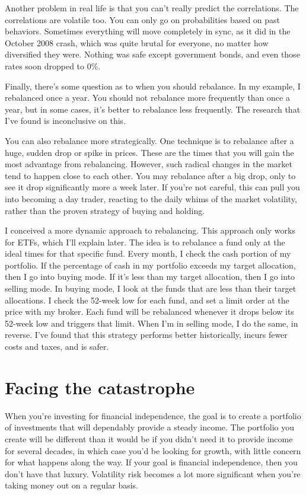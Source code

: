Another problem in real life is that you can't really predict the correlations. The correlations are volatile too. You can only go on probabilities based on past behaviors. Sometimes everything will move completely in sync, as it did in the October 2008 crash, which was quite brutal for everyone, no matter how diversified they were. Nothing was safe except government bonds, and even those rates soon dropped to 0\%.

Finally, there's some question as to when you should rebalance. In my example, I rebalanced once a year. You should not rebalance more frequently than once a year, but in some cases, it's better to rebalance less frequently. The research that I've found is inconclusive on this.

You can also rebalance more strategically. One technique is to rebalance after a huge, sudden drop or spike in prices. These are the times that you will gain the most advantage from rebalancing. However, such radical changes in the market tend to happen close to each other. You may rebalance after a big drop, only to see it drop significantly more a week later. If you're not careful, this can pull you into becoming a day trader, reacting to the daily whims of the market volatility, rather than the proven strategy of buying and holding.

I conceived a more dynamic approach to rebalancing. This approach only works for ETFs, which I'll explain later. The idea is to rebalance a fund only at the ideal times for that specific fund. Every month, I check the cash portion of my portfolio. If the percentage of cash in my portfolio exceeds my target allocation, then I go into buying mode. If it's less than my target allocation, then I go into selling mode. In buying mode, I look at the funds that are less than their target allocations. I check the 52-week low for each fund, and set a limit order at the price with my broker. Each fund will be rebalanced whenever it drops below its 52-week low and triggers that limit. When I'm in selling mode, I do the same, in reverse. I've found that this strategy performs better historically, incurs fewer costs and taxes, and is safer.

\section{Facing the catastrophe}
When you're investing for financial independence, the goal is to create a portfolio of investments that will dependably provide a steady income. The portfolio you create will be different than it would be if you didn't need it to provide income for several decades, in which case you'd be looking for growth, with little concern for what happens along the way. If your goal is financial independence, then you don't have that luxury. Volatility risk becomes a lot more significant when you're taking money out on a regular basis.

